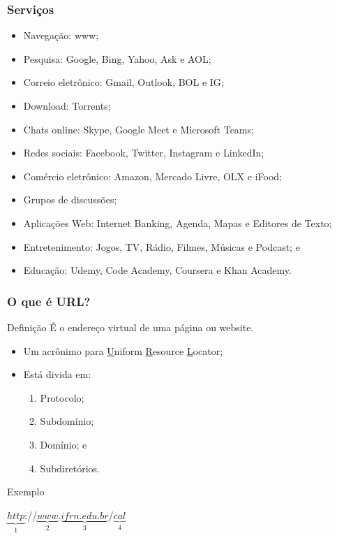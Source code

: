 \documentclass[aspectratio=169]{beamer} %
\begin{document}
\begin{frame}
	\frametitle{Servi\c cos}
			
	\begin{itemize}
		\item Navegação: www;
		\item Pesquisa: Google, Bing, Yahoo, Ask e AOL;	
		\item Correio eletrônico: Gmail, Outlook, BOL e IG;
		\item Download: Torrents;
		\item Chats online: Skype, Google Meet e Microsoft Teams;
		\item Redes sociais: Facebook, Twitter, Instagram e LinkedIn;
		\item Comércio eletrônico: Amazon, Mercado Livre, OLX e iFood;
		\item Grupos de discussões;
		\item Aplicações Web: Internet Banking, Agenda, Mapas e Editores de Texto;
		\item Entretenimento: Jogos, TV, Rádio, Filmes, Músicas e Podcast; e
		\item Educa\c cão: Udemy, Code Academy, Coursera e Khan Academy.
	\end{itemize}
\end{frame}

\begin{frame}
	\frametitle{O que é URL?}
	
	\begin{block}{Defini\c cão}
		É o endereço virtual de uma página ou website.
	\end{block} \vfill
		
	\begin{itemize}
		\item Um acrônimo para \underline{U}niform \underline{R}esource \underline{L}ocator;
		\item Está divida em: 
			\begin{enumerate}
				\item Protocolo; 
				\item Subdomínio; 
				\item Domínio; e 
				\item Subdiretórios.
			\end{enumerate}				
	\end{itemize} \vfill
	
	\begin{exampleblock}{Exemplo}
		\begin{center}
			$\underbrace{http}_{1}$://$\underbrace{www}_{2}$.$\underbrace{ifrn.edu.br}_{3}$/$\underbrace{cal}_{4}$
		\end{center}
	\end{exampleblock}
\end{frame}
\end{document}
